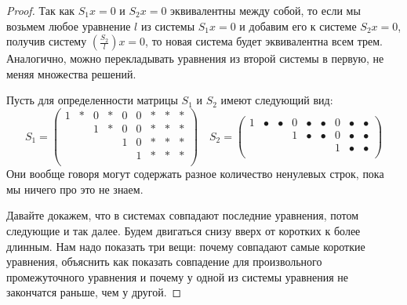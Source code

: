 \begin{proof}
Так как $S_1 x = 0$ и $S_2x = 0$ эквивалентны между собой, то если мы возьмем любое уравнение $l$ из системы $S_1 x = 0$ и добавим его к системе $S_2 x = 0$, получив систему $\left(\frac{S_2}{l}\right)x=0$, то новая система будет эквивалентна всем трем.
Аналогично, можно перекладывать уравнения из второй системы в первую, не меняя множества решений.

Пусть для определенности матрицы $S_1$  и $S_2$ имеют следующий вид:
\[
S_1 = 
\begin{pmatrix}
{1}&{*}&{0}&{*}&{0}&{0}&{*}&{*}&{*}\\
{}&{}&{1}&{*}&{0}&{0}&{*}&{*}&{*}\\
{}&{}&{}&{}&{1}&{0}&{*}&{*}&{*}\\
{}&{}&{}&{}&{}&{1}&{*}&{*}&{*}\\
\end{pmatrix}\quad
S_2 = 
\begin{pmatrix}
{1}&{\bullet}&{\bullet}&{0}&{\bullet}&{\bullet}&{0}&{\bullet}&{\bullet}\\
{}&{}&{}&{1}&{\bullet}&{\bullet}&{0}&{\bullet}&{\bullet}\\
{}&{}&{}&{}&{}&{}&{1}&{\bullet}&{\bullet}\\
\end{pmatrix}
\]
Они вообще говоря могут содержать разное количество ненулевых строк, пока мы ничего про это не знаем.

Давайте докажем, что в системах совпадают последние уравнения, потом следующие и так далее.
Будем двигаться снизу вверх от коротких к более длинным.
Нам надо показать три вещи: почему совпадают самые короткие уравнения, объяснить как показать совпадение для произвольного промежуточного уравнения и почему у одной из системы уравнения не закончатся раньше, чем у другой.


\end{proof}
